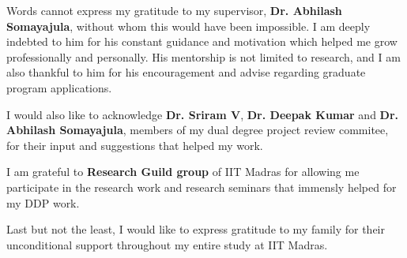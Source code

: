 \acknowledgements
Words cannot express my gratitude to my supervisor, {\bf Dr. Abhilash Somayajula}, 
without whom this would have been impossible. I am deeply indebted to him for 
his constant guidance and motivation which helped me grow professionally and 
personally. His mentorship is not limited to research, and I am also thankful 
to him for his encouragement and advise regarding graduate program applications.

I would also like to acknowledge {\bf Dr. Sriram V}, {\bf Dr. Deepak Kumar} and 
{\bf Dr. Abhilash Somayajula}, members of my dual degree project review commitee, for 
their input and suggestions that helped my work.

I am grateful to {\bf Research Guild group} of IIT Madras for allowing me 
participate in the research work and research seminars that immensly helped 
for my DDP work.

Last but not the least, I would like to express gratitude to my family for 
their unconditional support throughout my entire study at IIT Madras.